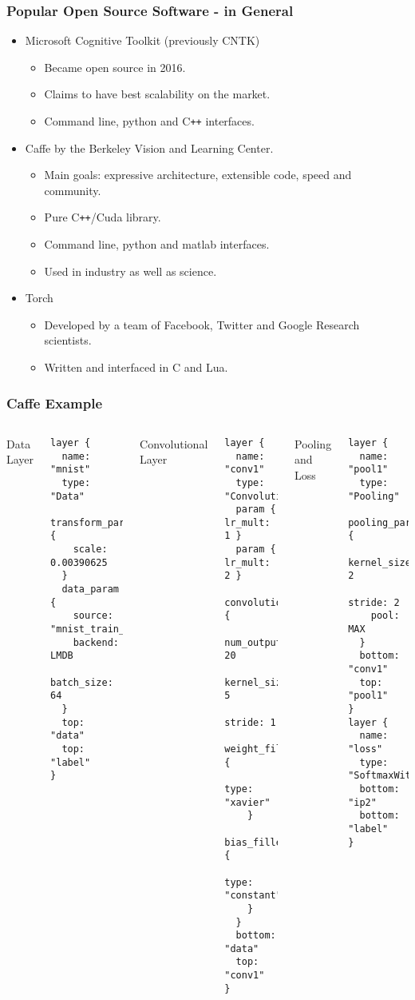 \documentclass[9pt]{beamer}
\begin{document}
\begin{frame}
\frametitle{Popular Open Source Software - in General}
\begin{itemize}
\item Microsoft Cognitive Toolkit (previously CNTK)
\begin{itemize}
\item Became open source in 2016.
\item Claims to have best scalability on the market.
\item Command line, python and C\texttt{++} interfaces.
\end{itemize}
\item Caffe by the Berkeley Vision and Learning Center. 
\begin{itemize}
\item Main goals: expressive architecture, extensible code, speed and community.
\item Pure C\texttt{++}/Cuda library.
\item Command line, python and matlab interfaces.
\item Used in industry as well as science.
\end{itemize}
\item Torch
\begin{itemize}
\item Developed by a team of Facebook, Twitter and Google Research scientists. 	
\item Written and interfaced in C and Lua.
\end{itemize}
\end{itemize}
\end{frame}

\begin{frame}[fragile]
\frametitle{Caffe Example}
\small
\begin{columns}
\column[t]{3.5cm}
Data Layer
\begin{verbatim}
layer {
  name: "mnist"
  type: "Data"
  transform_param {
    scale: 0.00390625
  }
  data_param {
    source: "mnist_train_lmdb"
    backend: LMDB
    batch_size: 64
  }
  top: "data"
  top: "label"
}
\end{verbatim}
\column[t]{3.5cm}
Convolutional Layer
\begin{verbatim}
layer {
  name: "conv1"
  type: "Convolution"
  param { lr_mult: 1 }
  param { lr_mult: 2 }
  convolution_param {
    num_output: 20
    kernel_size: 5
    stride: 1
    weight_filler {
      type: "xavier"
    }
    bias_filler {
      type: "constant"
    }
  }
  bottom: "data"
  top: "conv1"
}
\end{verbatim}
\column[t]{3.5cm}
Pooling and Loss
\begin{verbatim}
layer {
  name: "pool1"
  type: "Pooling"
  pooling_param {
    kernel_size: 2
    stride: 2
    pool: MAX
  }
  bottom: "conv1"
  top: "pool1"
}
layer {
  name: "loss"
  type: "SoftmaxWithLoss"
  bottom: "ip2"
  bottom: "label"
}
\end{verbatim}
\end{columns}
\end{frame}
\end{document}
